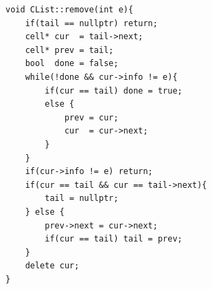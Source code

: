 \begin{codebox}
    \begin{lstlisting}
void CList::remove(int e){
    if(tail == nullptr) return;
    cell* cur  = tail->next;
    cell* prev = tail;
    bool  done = false;
    while(!done && cur->info != e){
        if(cur == tail) done = true;
        else {
            prev = cur;
            cur  = cur->next;
        }
    }
    if(cur->info != e) return;
    if(cur == tail && cur == tail->next){
        tail = nullptr;
    } else {
        prev->next = cur->next;
        if(cur == tail) tail = prev;
    }
    delete cur;
}
    \end{lstlisting}
\end{codebox}
